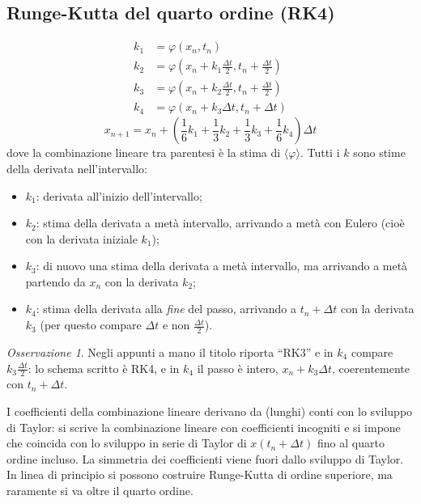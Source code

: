 \documentclass[11pt, a4paper, openright]{book}
\theoremstyle{plain}
\theoremstyle{definition}
\theoremstyle{remark}
\newtheorem{osservazione}[teorema]{Osservazione}
\begin{document}
\subsection{Runge-Kutta del quarto ordine (RK4)}
\begin{align}
    k_1 &= \varphi(x_n, t_n) \\
    k_2 &= \varphi\left(x_n + k_1\frac{\Delta t}{2}, t_n + \frac{\Delta t}{2}\right) \\
    k_3 &= \varphi\left(x_n + k_2\frac{\Delta t}{2}, t_n + \frac{\Delta t}{2}\right) \\
    k_4 &= \varphi\left(x_n + k_3\Delta t, t_n + \Delta t\right)
\end{align}
\begin{equation}
    \boxed{x_{n + 1} = x_n + \left(\frac{1}{6}k_1 + \frac{1}{3}k_2 + \frac{1}{3}k_3 + \frac{1}{6}k_4\right)\Delta t}
\end{equation}
dove la combinazione lineare tra parentesi è la stima di $\langle\varphi\rangle$. Tutti i $k$ sono stime della derivata nell'intervallo:
\begin{itemize}
    \item $k_1$: derivata all'inizio dell'intervallo;
    \item $k_2$: stima della derivata a metà intervallo, arrivando a metà con Eulero (cioè con la derivata iniziale $k_1$);
    \item $k_3$: di nuovo una stima della derivata a metà intervallo, ma arrivando a metà partendo da $x_n$ con la derivata $k_2$;
    \item $k_4$: stima della derivata alla \emph{fine} del passo, arrivando a $t_n + \Delta t$ con la derivata $k_3$ (per questo compare $\Delta t$ e non $\frac{\Delta t}{2}$).
\end{itemize}
\begin{osservazione}
    Negli appunti a mano il titolo riporta ``RK3'' e in $k_4$ compare $k_3\frac{\Delta t}{2}$: lo schema scritto è RK4, e in $k_4$ il passo è intero, $x_n + k_3\Delta t$, coerentemente con $t_n + \Delta t$.
\end{osservazione}

I coefficienti della combinazione lineare derivano da (lunghi) conti con lo sviluppo di Taylor: si scrive la combinazione lineare con coefficienti incogniti e si impone che coincida con lo sviluppo in serie di Taylor di $x(t_n + \Delta t)$ fino al quarto ordine incluso. La simmetria dei coefficienti viene fuori dallo sviluppo di Taylor. In linea di principio si possono costruire Runge-Kutta di ordine superiore, ma raramente si va oltre il quarto ordine.
\end{document}
